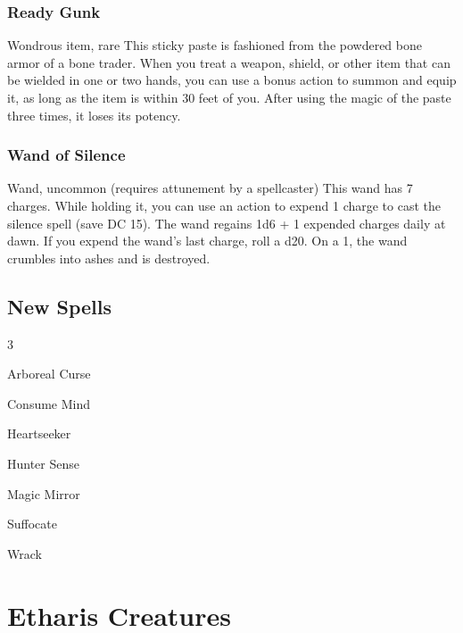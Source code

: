 \documentclass[10pt,a4paper,twoside,twocolumn,openany,bg=print,nodeprecatedcode]{dndbook}
\begin{document}
\subsection{Ready Gunk}
Wondrous item, rare
This sticky paste is fashioned from the powdered bone armor of a bone trader. When you treat a weapon, shield, or other item that can be wielded in one or two hands, you can use a bonus action to summon and equip it, as long as the item is within 30 feet of you. After using the magic of the paste three times, it loses its potency.
\subsection{Wand of Silence}
Wand, uncommon (requires attunement by a spellcaster)
This wand has 7 charges. While holding it, you can use an action to expend 1 charge to cast the silence spell (save DC 15). The wand regains 1d6 + 1 expended charges daily at dawn. If you expend the wand's last charge, roll a d20. On a 1, the wand crumbles into ashes and is destroyed.
\section{New Spells}

\begin{itemize}
\begin{multicols}{3}
\item Arboreal Curse
\item Consume Mind
\item Heartseeker
\item Hunter Sense
\item Magic Mirror
\item Suffocate
\item Wrack
\end{multicols}

\end{itemize}

\chapter{Etharis Creatures}
\end{document}
